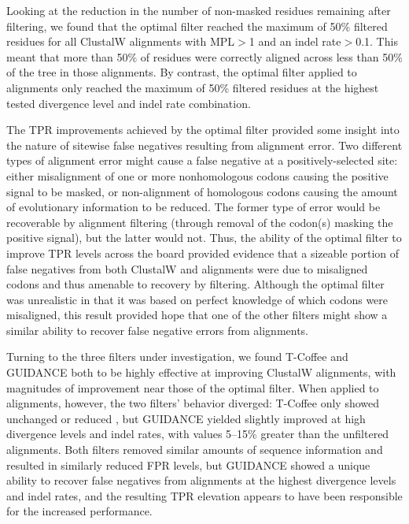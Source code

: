 \documentclass{article}
\begin{document}
Looking at the reduction in the number of non-masked residues
remaining after filtering, we found that the optimal filter reached
the maximum of 50\% filtered residues for all ClustalW alignments with
MPL$>$1 and an indel rate$>$0.1. This meant that more than 50\% of
residues were correctly aligned across less than 50\% of the tree in
those alignments. By contrast, the optimal filter applied to \prankc
alignments only reached the maximum of 50\% filtered residues at the
highest tested divergence level and indel rate combination.

The TPR improvements achieved by the optimal filter provided some
insight into the nature of sitewise false negatives resulting from
alignment error. Two different types of alignment error might cause a
false negative at a positively-selected site: either misalignment of
one or more nonhomologous codons causing the positive signal to be
masked, or non-alignment of homologous codons causing the amount of
evolutionary information to be reduced. The former type of error would
be recoverable by alignment filtering (through removal of the codon(s)
masking the positive signal), but the latter would not. Thus, the
ability of the optimal filter to improve TPR levels across the board
provided evidence that a sizeable portion of false negatives from both
ClustalW and \prankc alignments were due to misaligned codons and thus
amenable to recovery by filtering. Although the optimal filter was
unrealistic in that it was based on perfect knowledge of which codons
were misaligned, this result provided hope that one of the other
filters might show a similar ability to recover false negative errors
from \prankc alignments.

Turning to the three filters under investigation, we found T-Coffee
and GUIDANCE both to be highly effective at improving ClustalW
alignments, with magnitudes of improvement near those of the optimal
filter. When applied to \prankc alignments, however, the two filters'
behavior diverged: T-Coffee only showed unchanged or reduced \tpr, but
GUIDANCE yielded slightly improved \tpr at high divergence levels and
indel rates, with values 5--15\% greater than the unfiltered \prankc
alignments. Both filters removed similar amounts of sequence
information and resulted in similarly reduced FPR levels, but GUIDANCE
showed a unique ability to recover false negatives from \prankc
alignments at the highest divergence levels and indel rates, and the
resulting TPR elevation appears to have been responsible for the
increased \tpr performance.
\end{document}
